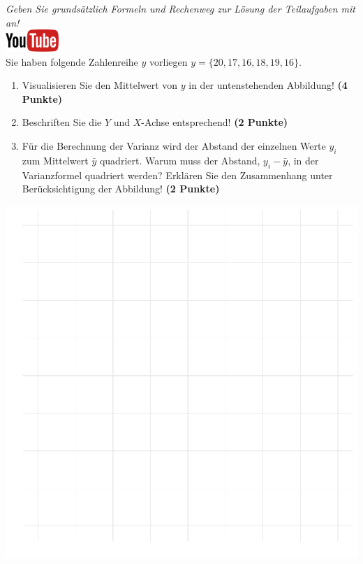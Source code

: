 \documentclass[a4paper, 9pt]{scrartcl}\usepackage[]{graphicx}\usepackage[]{xcolor}
\makeatletter
\def\maxwidth{ %
  \ifdim\Gin@nat@width>\linewidth
    \linewidth
  \else
    \Gin@nat@width
  \fi
}
\makeatother
\begin{document}
\textit{Geben Sie grunds{\"a}tzlich Formeln und Rechenweg zur L{\"o}sung der
  Teilaufgaben mit an!} \\[1Ex]

\hfill\href{https://youtu.be/oMdtYbDInYE}{\includegraphics[width =
  2cm]{img/youtube}}\\[1Ex]

Sie haben folgende Zahlenreihe $y$ vorliegen
$y = \{20, 17, 16, 18, 19, 16\}$.

\begin{enumerate}
\item Visualisieren Sie den Mittelwert von $y$ in der untenstehenden
  Abbildung! \textbf{(4 Punkte)}
\item Beschriften Sie die $Y$ und $X$-Achse entsprechend! \textbf{(2 Punkte)}
\item F{\"u}r die Berechnung der Varianz wird der Abstand der einzelnen Werte $y_i$
  zum Mittelwert $\bar{y}$ quadriert. Warum muss der Abstand, $y_i -
  \bar{y}$, in der Varianzformel quadriert werden?
  Erkl{\"a}ren Sie den Zusammenhang unter Ber{\"u}cksichtigung der Abbildung!
  \textbf{(2 Punkte)}  
\end{enumerate}



{\centering \includegraphics[width=\maxwidth]{img/desc-01-1} 

}
\end{document}
